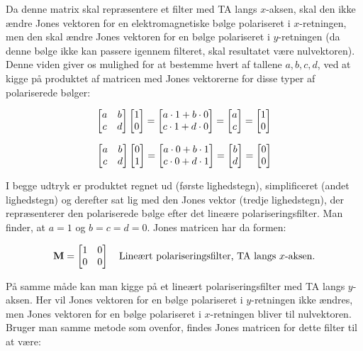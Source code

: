 Da denne matrix skal repræsentere et filter med TA langs $x$-aksen, skal den ikke ændre Jones vektoren for en elektromagnetiske bølge polariseret i $x$-retningen, men den skal ændre Jones vektoren for en bølge polariseret i $y$-retningen (da denne bølge ikke kan passere igennem filteret, skal resultatet være nulvektoren). Denne viden giver os mulighed for at bestemme hvert af tallene $a,b,c,d$, ved at kigge på produktet af matricen med Jones vektorerne for disse typer af polariserede bølger:

$$\begin{bmatrix} a & b \\ c & d \\ \end{bmatrix} \begin{bmatrix} 1 \\ 0 \end{bmatrix} = \begin{bmatrix} a \cdot 1 + b \cdot 0 \\ c \cdot 1 + d \cdot 0 \end{bmatrix} = \begin{bmatrix} a \\ c \end{bmatrix} = \begin{bmatrix} 1 \\ 0 \end{bmatrix}$$

\vspace{2mm}

$$\begin{bmatrix} a & b \\ c & d \\ \end{bmatrix} \begin{bmatrix} 0 \\ 1 \end{bmatrix} = \begin{bmatrix} a \cdot 0 + b \cdot 1 \\ c \cdot 0 + d \cdot 1 \end{bmatrix} = \begin{bmatrix} b \\ d \end{bmatrix} = \begin{bmatrix} 0 \\ 0 \end{bmatrix}$$

\vspace{2mm}

I begge udtryk er produktet regnet ud (første lighedstegn), simplificeret (andet lighedstegn) og derefter sat lig med den Jones vektor (tredje lighedstegn), der repræsenterer den polariserede bølge efter det lineære polariseringsfilter. Man finder, at $a=1$ og $b=c=d = 0$. Jones matricen har da formen:

\begin{equation}
\mathbf{M} = \begin{bmatrix} 1 & 0 \\ 0 & 0 \end{bmatrix} \quad \text{Lineært polariseringsfilter, TA langs $x$-aksen.}
\label{pol_filt_x}
\end{equation}

\vspace{2mm}

På samme måde kan man kigge på et lineært polariseringsfilter med TA langs $y$-aksen. Her vil Jones vektoren for en bølge polariseret i $y$-retningen ikke ændres, men Jones vektoren for en bølge polariseret i $x$-retningen bliver til nulvektoren. Bruger man samme metode som ovenfor, findes Jones matricen for dette filter til at være:

